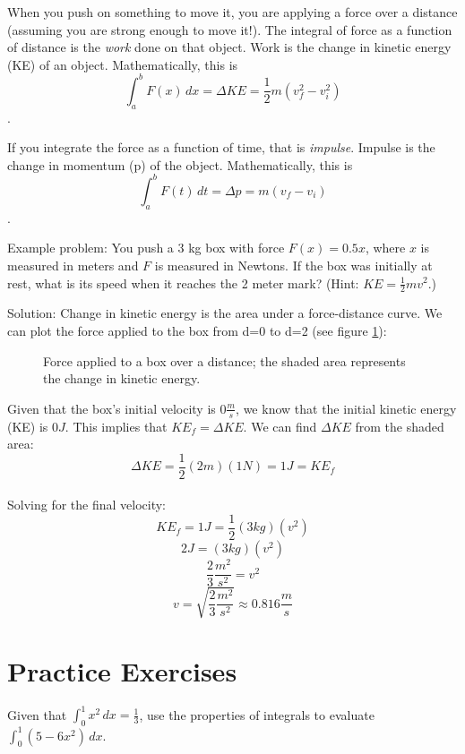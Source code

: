 When you push on something to move it, you are applying a force over 
a distance (assuming you are strong enough to move it!). The integral 
of force as a function of distance is the \textit{work} done on that 
object.  Work is the change in kinetic energy (KE) of an object. 
Mathematically, this is $$\int_{a}^{b} F(x)\,dx = \Delta KE = 
\frac{1}{2} m (v_f^2 - v_i^2)$$.

If you integrate the force as a function of time, that is 
\textit{impulse}. Impulse is the change in momentum (p) of the 
object. Mathematically, this is $$\int_{a}^{b} F(t)\,dt = \Delta p 
= m (v_f - v_i)$$.

Example problem: You push a 3 kg box with force $F(x) = 0.5x$, where 
$x$ is measured in meters and $F$ is measured in Newtons. If the box 
was initially at rest, what is its speed when it reaches the 2 meter 
mark? (Hint: $KE = \frac{1}{2} m v^2$.) 

Solution: Change in kinetic energy is the area under a force-distance 
curve. We can plot the force applied to the box from d=0 to d=2 (see 
figure \ref{fig:KEbox}):

\begin{figure}[htbp]
 \caption{Force applied to a box over a distance; the shaded area 
 represents the change in kinetic energy.}
 \label{fig:KEbox}
\end{figure}

Given that the box's initial velocity is $0 \frac{m}{s}$, we know that 
the initial kinetic energy (KE) is $0J$. This implies that $KE_f = 
\Delta KE$. We can find $\Delta KE$ from the shaded area:\\
$$\Delta KE = \frac{1}{2} (2m) (1N) = 1 J = KE_f$$\\
Solving for the final velocity:\\
$$KE_f = 1 J = \frac{1}{2}(3kg)(v^2)$$
$$2 J = (3 kg) (v^2)$$
$$\frac{2}{3} \frac{m^2}{s^2} = v^2$$
$$v=\sqrt{\frac{2}{3} \frac{m^2}{s^2}} \approx 0.816 \frac{m}{s}$$


\section{Practice Exercises}
\begin{Exercise}[label=defint2]
Given that $\int_{0}^{1} x^2\,dx = \frac{1}{3}$, use the properties 
of integrals to evaluate $\int_{0}^{1} (5-6x^2)\,dx$. 
\end{Exercise}

